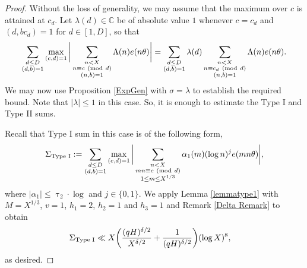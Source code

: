 \documentclass[12pt]{amsart}
\numberwithin{equation}{section}
\theoremstyle{remark}
\theoremstyle{definition}
\newcommand{\imod}[1]{\ (\mathrm{mod}\ #1)}
\begin{document}
\begin{proof}
Without the loss of generality, we may assume that the maximum over $c$ is attained at $c_d$. Let $\lambda(d)\in \mathbb{C}$ be of absolute value $1$ whenever $c=c_d$ and $(d, bc_d)=1$ for $d\in [1, D]$, so that
\begin{align}
\notag \sum_{\substack{d\leq D\\(d,b)=1}}\max_{(c,d)=1}\bigg\lvert\sum_{\substack{n<X\\n \equiv c \imod d\\(n, b)=1}}\Lambda(n)e(n\theta)\bigg| =  \sum_{\substack{d\leq D\\(d, b)=1}}\lambda(d)\sum_{\substack{n<X\\n \equiv c_d \imod d\\(n, b)=1}}\Lambda(n)e(n\theta).
\end{align}
We may now use Proposition \ref{ExpGen} with $\sigma =\lambda$ to establish the required bound. Note that $|\lambda|\leq 1$ in this case. So, it is enough to estimate the Type I and Type II sums.


 Recall that Type I sum in this case is of the following form,
\begin{align}\notag 
\Sigma_{\text{Type I}}:= \sum_{\substack{d\leq D\\(d,b)=1}}\max_{(c,d)=1}\bigg\lvert\sum_{\substack{n<X\\mn \equiv c \imod d\\ 1\leq m\leq X^{1/3}}}\alpha_1(m)(\log n)^je(mn\theta)\bigg|,
\end{align}
where $|\alpha_1| \leq \uptau_2\cdot \log$ and $j\in \{0, 1\}$. We apply Lemma \ref{lemmatype1} with $M=X^{1/3}$, $v=1$, $h_1=2$, $h_2=1$ and $h_3=1$ and Remark \ref{Delta Remark} to obtain
\begin{align}\notag 
\Sigma_{\text{Type I}}  &\ll X\bigg(\dfrac{(qH)^{\delta/2}}{X^{\delta/2}} + \dfrac{1}{(qH)^{\delta/2}}\bigg)(\log X)^8,
\end{align}
as desired.


\end{proof}
\end{document}

